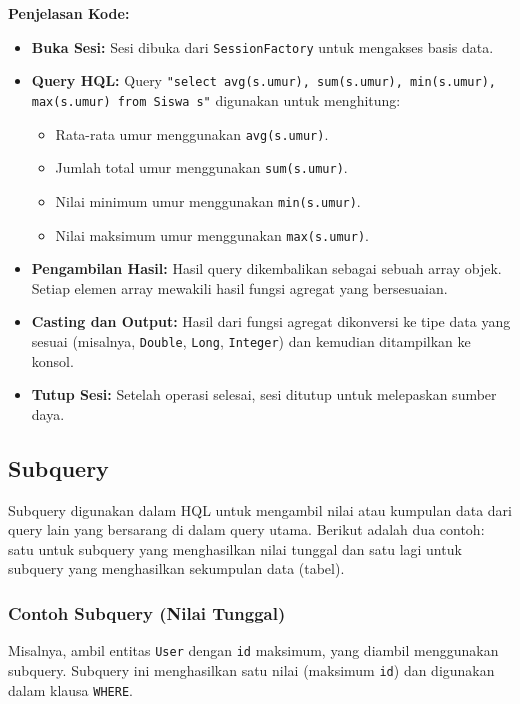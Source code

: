 \textbf{Penjelasan Kode:}
\begin{itemize}
	\item \textbf{Buka Sesi:} Sesi dibuka dari \texttt{SessionFactory} untuk mengakses basis data.
	\item \textbf{Query HQL:} Query \texttt{"select avg(s.umur), sum(s.umur), min(s.umur), max(s.umur) from Siswa s"} digunakan untuk menghitung:
	\begin{itemize}
		\item Rata-rata umur menggunakan \texttt{avg(s.umur)}.
		\item Jumlah total umur menggunakan \texttt{sum(s.umur)}.
		\item Nilai minimum umur menggunakan \texttt{min(s.umur)}.
		\item Nilai maksimum umur menggunakan \texttt{max(s.umur)}.
	\end{itemize}
	\item \textbf{Pengambilan Hasil:} Hasil query dikembalikan sebagai sebuah array objek. Setiap elemen array mewakili hasil fungsi agregat yang bersesuaian.
	\item \textbf{Casting dan Output:} Hasil dari fungsi agregat dikonversi ke tipe data yang sesuai (misalnya, \texttt{Double}, \texttt{Long}, \texttt{Integer}) dan kemudian ditampilkan ke konsol.
	\item \textbf{Tutup Sesi:} Setelah operasi selesai, sesi ditutup untuk melepaskan sumber daya.
\end{itemize}

\subsection{Subquery}

Subquery digunakan dalam HQL untuk mengambil nilai atau kumpulan data dari query lain yang bersarang di dalam query utama. Berikut adalah dua contoh: satu untuk subquery yang menghasilkan nilai tunggal dan satu lagi untuk subquery yang menghasilkan sekumpulan data (tabel).

\subsubsection*{Contoh Subquery (Nilai Tunggal)}
Misalnya, ambil entitas \texttt{User} dengan \texttt{id} maksimum, yang diambil menggunakan subquery. Subquery ini menghasilkan satu nilai (maksimum \texttt{id}) dan digunakan dalam klausa \texttt{WHERE}.

